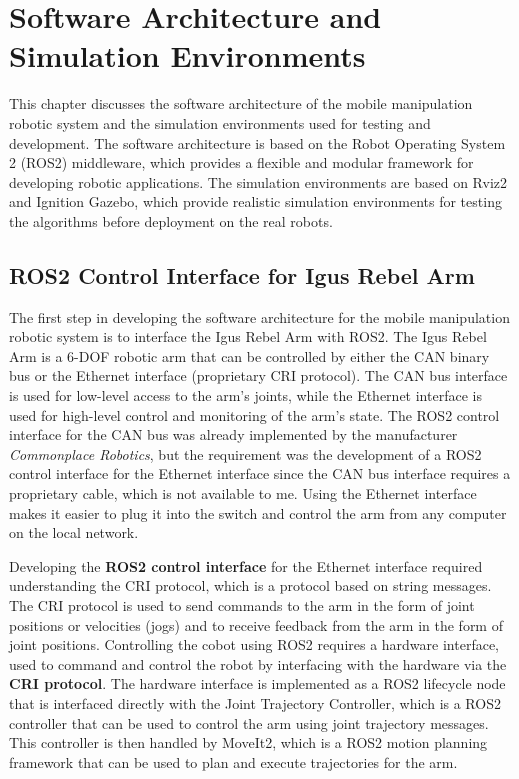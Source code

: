 
\chapter{Software Architecture and Simulation Environments}

This chapter discusses the software architecture of the mobile manipulation robotic system and the simulation 
environments used for testing and development. The software architecture is based on the Robot Operating System 2 (ROS2)
middleware, which provides a flexible and modular framework for developing robotic applications. 
The simulation environments are based on Rviz2 and Ignition Gazebo, which provide realistic simulation environments
for testing the algorithms before deployment on the real robots.

\section{ROS2 Control Interface for Igus Rebel Arm}

The first step in developing the software architecture for the mobile manipulation robotic system is to interface the
Igus Rebel Arm with ROS2. The Igus Rebel Arm is a 6-DOF robotic arm that can be controlled by either the CAN binary bus
or the Ethernet interface (proprietary CRI protocol). The CAN bus interface is used for low-level access to the arm's
joints, while the Ethernet interface is used for high-level control and monitoring of the arm's state. 
The ROS2 control interface for the CAN bus was already implemented by the manufacturer \textit{Commonplace Robotics},
but the requirement was the development of a ROS2 control interface for the Ethernet interface since the CAN bus interface
requires a proprietary cable, which is not available to me. Using the Ethernet interface makes it easier to 
plug it into the switch and control the arm from any computer on the local network.

Developing the \textbf{ROS2 control interface} for the Ethernet interface required understanding the CRI protocol, which
is a protocol based on string messages. The CRI protocol is used to send commands to the arm in the form of
joint positions or velocities (jogs) and to receive feedback from the arm in the form of joint positions.
Controlling the cobot using ROS2 requires a hardware interface, used to command and control the robot by interfacing
with the hardware via the \textbf{CRI protocol}. The hardware interface is implemented as a ROS2 lifecycle node that
is interfaced directly with the Joint Trajectory Controller, which is a ROS2 controller that can be used to
control the arm using joint trajectory messages. This controller is then handled by MoveIt2, which is a ROS2
motion planning framework that can be used to plan and execute trajectories for the arm.

